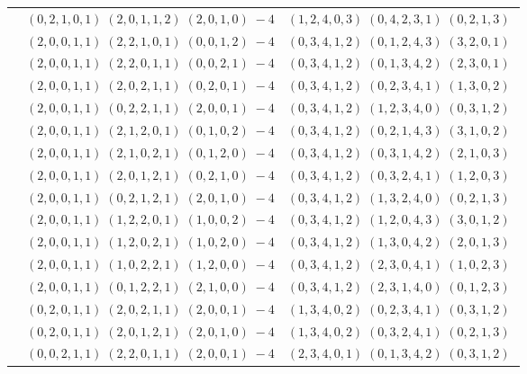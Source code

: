 \documentclass[11pt]{article}
\begin{document}
\begin{longtable}[l]{|c|c|c|}
 \cline{2-3} 
 & $(0 ,2 ,1 ,0 ,1) \;(2 ,0 ,1 ,1 ,2) \;(2 ,0 ,1 ,0) \;-4$ & $(1 ,2 ,4 ,0 ,3) \;(0 ,4 ,2 ,3 ,1) \;(0 ,2 ,1 ,3) \;$\\ 
 \cline{2-3} 
 & $(2 ,0 ,0 ,1 ,1) \;(2 ,2 ,1 ,0 ,1) \;(0 ,0 ,1 ,2) \;-4$ & $(0 ,3 ,4 ,1 ,2) \;(0 ,1 ,2 ,4 ,3) \;(3 ,2 ,0 ,1) \;$\\ 
 \cline{2-3} 
 & $(2 ,0 ,0 ,1 ,1) \;(2 ,2 ,0 ,1 ,1) \;(0 ,0 ,2 ,1) \;-4$ & $(0 ,3 ,4 ,1 ,2) \;(0 ,1 ,3 ,4 ,2) \;(2 ,3 ,0 ,1) \;$\\ 
 \cline{2-3} 
 & $(2 ,0 ,0 ,1 ,1) \;(2 ,0 ,2 ,1 ,1) \;(0 ,2 ,0 ,1) \;-4$ & $(0 ,3 ,4 ,1 ,2) \;(0 ,2 ,3 ,4 ,1) \;(1 ,3 ,0 ,2) \;$\\ 
 \cline{2-3} 
 & $(2 ,0 ,0 ,1 ,1) \;(0 ,2 ,2 ,1 ,1) \;(2 ,0 ,0 ,1) \;-4$ & $(0 ,3 ,4 ,1 ,2) \;(1 ,2 ,3 ,4 ,0) \;(0 ,3 ,1 ,2) \;$\\ 
 \cline{2-3} 
 & $(2 ,0 ,0 ,1 ,1) \;(2 ,1 ,2 ,0 ,1) \;(0 ,1 ,0 ,2) \;-4$ & $(0 ,3 ,4 ,1 ,2) \;(0 ,2 ,1 ,4 ,3) \;(3 ,1 ,0 ,2) \;$\\ 
 \cline{2-3} 
 & $(2 ,0 ,0 ,1 ,1) \;(2 ,1 ,0 ,2 ,1) \;(0 ,1 ,2 ,0) \;-4$ & $(0 ,3 ,4 ,1 ,2) \;(0 ,3 ,1 ,4 ,2) \;(2 ,1 ,0 ,3) \;$\\ 
 \cline{2-3} 
 & $(2 ,0 ,0 ,1 ,1) \;(2 ,0 ,1 ,2 ,1) \;(0 ,2 ,1 ,0) \;-4$ & $(0 ,3 ,4 ,1 ,2) \;(0 ,3 ,2 ,4 ,1) \;(1 ,2 ,0 ,3) \;$\\ 
 \cline{2-3} 
 & $(2 ,0 ,0 ,1 ,1) \;(0 ,2 ,1 ,2 ,1) \;(2 ,0 ,1 ,0) \;-4$ & $(0 ,3 ,4 ,1 ,2) \;(1 ,3 ,2 ,4 ,0) \;(0 ,2 ,1 ,3) \;$\\ 
 \cline{2-3} 
 & $(2 ,0 ,0 ,1 ,1) \;(1 ,2 ,2 ,0 ,1) \;(1 ,0 ,0 ,2) \;-4$ & $(0 ,3 ,4 ,1 ,2) \;(1 ,2 ,0 ,4 ,3) \;(3 ,0 ,1 ,2) \;$\\ 
 \cline{2-3} 
 & $(2 ,0 ,0 ,1 ,1) \;(1 ,2 ,0 ,2 ,1) \;(1 ,0 ,2 ,0) \;-4$ & $(0 ,3 ,4 ,1 ,2) \;(1 ,3 ,0 ,4 ,2) \;(2 ,0 ,1 ,3) \;$\\ 
 \cline{2-3} 
 & $(2 ,0 ,0 ,1 ,1) \;(1 ,0 ,2 ,2 ,1) \;(1 ,2 ,0 ,0) \;-4$ & $(0 ,3 ,4 ,1 ,2) \;(2 ,3 ,0 ,4 ,1) \;(1 ,0 ,2 ,3) \;$\\ 
 \cline{2-3} 
 & $(2 ,0 ,0 ,1 ,1) \;(0 ,1 ,2 ,2 ,1) \;(2 ,1 ,0 ,0) \;-4$ & $(0 ,3 ,4 ,1 ,2) \;(2 ,3 ,1 ,4 ,0) \;(0 ,1 ,2 ,3) \;$\\ 
 \cline{2-3} 
 & $(0 ,2 ,0 ,1 ,1) \;(2 ,0 ,2 ,1 ,1) \;(2 ,0 ,0 ,1) \;-4$ & $(1 ,3 ,4 ,0 ,2) \;(0 ,2 ,3 ,4 ,1) \;(0 ,3 ,1 ,2) \;$\\ 
 \cline{2-3} 
 & $(0 ,2 ,0 ,1 ,1) \;(2 ,0 ,1 ,2 ,1) \;(2 ,0 ,1 ,0) \;-4$ & $(1 ,3 ,4 ,0 ,2) \;(0 ,3 ,2 ,4 ,1) \;(0 ,2 ,1 ,3) \;$\\ 
 \cline{2-3} 
 & $(0 ,0 ,2 ,1 ,1) \;(2 ,2 ,0 ,1 ,1) \;(2 ,0 ,0 ,1) \;-4$ & $(2 ,3 ,4 ,0 ,1) \;(0 ,1 ,3 ,4 ,2) \;(0 ,3 ,1 ,2) \;$\\ 

\end{longtable}
\end{document}
